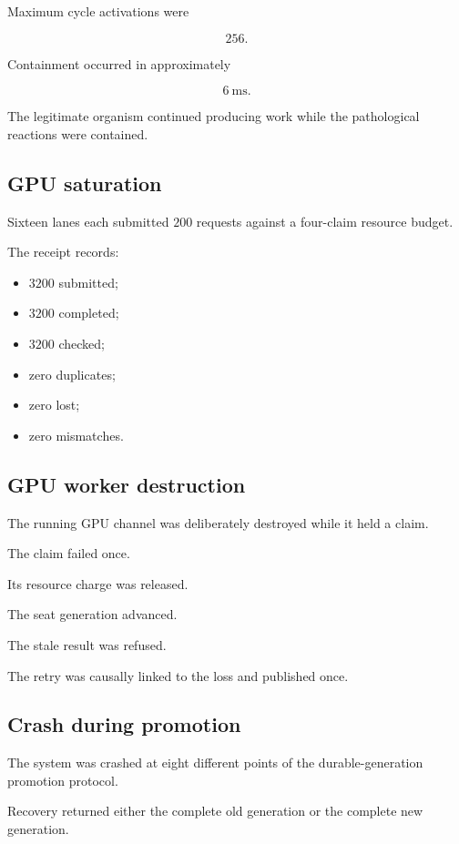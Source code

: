 \documentclass[11pt]{article}
\begin{document}
Maximum cycle activations were

\[
256.
\]

Containment occurred in approximately

\[
6\ \mathrm{ms}.
\]

The legitimate organism continued producing work while the pathological reactions were contained.

\subsection{GPU saturation}

Sixteen lanes each submitted \(200\) requests against a four-claim resource budget.

The receipt records:

\begin{itemize}
    \item \(3200\) submitted;
    \item \(3200\) completed;
    \item \(3200\) checked;
    \item zero duplicates;
    \item zero lost;
    \item zero mismatches.
\end{itemize}

\subsection{GPU worker destruction}

The running GPU channel was deliberately destroyed while it held a claim.

The claim failed once.

Its resource charge was released.

The seat generation advanced.

The stale result was refused.

The retry was causally linked to the loss and published once.

\subsection{Crash during promotion}

The system was crashed at eight different points of the durable-generation promotion protocol.

Recovery returned either the complete old generation or the complete new generation.
\end{document}
